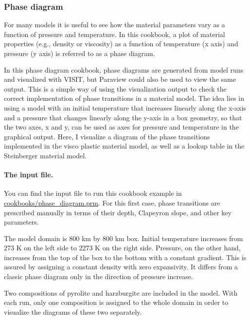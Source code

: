 \subsubsection{Phase diagram}

\label{sec:phase-diagram}
For many models it is useful to see how the material parameters vary as a function of pressure and temperature. In this cookbook, a plot of material properties (e.g., density or viscosity) as a function of temperature (x axis) and pressure (y axis) is referred to as a phase diagram. 

In this phase diagram cookbook, phase diagrams are generated from model runs and visualized with VISIT, but Paraview could also be used to view the same output. %
This is a simple way of using the visualization output to check the correct implementation of phase transitions in a material model. 
The idea lies in using a model with an initial temperature that increases linearly along the x-axis and a pressure that changes linearly along the y-axis in a box geometry, so that the two axes, x and y, can be used as axes for pressure and temperature in the graphical output. 
Here, I visualize a diagram of the phase transitions implemented in the visco plastic material model, as well as a lookup table in the Steinberger material model. 

\paragraph{The input file.}
You can find the input file to run this cookbook example in \url{cookbooks/phase_diagram.prm}. For this first case, phase transitions are prescribed manually in terms of their depth, Clapeyron slope, and other key parameters. 

\par The model domain is  800 km  by 800 km box. %
Initial temperature increases from 273 K on the left side to 2273 K on the right side. %
Pressure, on the other hand, increases from the top of the box to the bottom with a constant gradient.
This is assured by assigning a constant density with zero expansivity.
It differs from a classic phase diagram only in the direction of pressure increase.

\par Two compositions of pyrolite and harzburgite are included in the model. %
With each run, only one composition is assigned to the whole domain in order to visualize the diagrams of these two separately.

